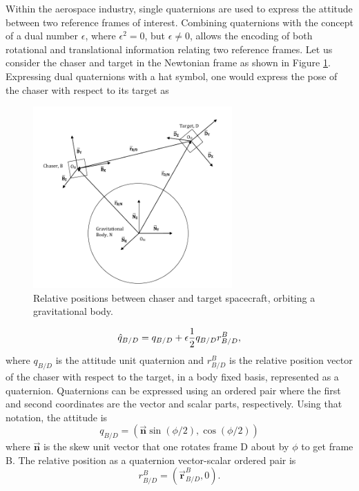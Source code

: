 \documentclass[letterpaper, preprint, paper,11pt]{AAS}	%
\begin{document}
Within the aerospace industry, single quaternions are used to express the attitude between two reference frames of interest. Combining quaternions with the concept of a dual number $\epsilon$, where $\epsilon^2 = 0$, but $\epsilon \ne 0$, allows the encoding of both rotational and translational information relating two reference frames. Let us consider the chaser and target in the Newtonian frame as shown in Figure \ref{fig:Rel_Pos}. Expressing dual quaternions with a hat symbol, one would express the pose of the chaser with respect to its target as

\begin{figure}[h!]
	\centering\includegraphics[width=3.0in]{Figures/REL_POSE.pdf}
	\caption{Relative positions between chaser and target spacecraft, orbiting a gravitational body.}
	\label{fig:Rel_Pos}
\end{figure}

\begin{equation}
\begin{aligned}
\label{eq:dual_quat_eg}
\hat{q}_{B/D} = q_{B/D} + \epsilon \frac{1}{2} q_{B/D} r^B_{B/D},
\end{aligned}\\
\end{equation}
where $q_{B/D}$ is the attitude unit quaternion and $r^B_{B/D}$ is the relative position vector of the chaser with respect to the target, in a body fixed basis, represented as a quaternion. Quaternions can be expressed using an ordered pair where the first and second coordinates are the vector and scalar parts, respectively. Using that notation, the attitude is
\begin{equation}
\label{eq:att_quat}
q_{B/D} = (\vec{\mathbf{n}}\sin{(\phi/2)} , \cos{(\phi/2)}) 
\end{equation}
where $\vec{\mathbf{n}}$ is the skew unit vector that one rotates frame D about by $\phi$ to get frame B. The relative position as a quaternion vector-scalar ordered pair is 
\begin{equation}
\label{eq:pos_quat}
r_{B/D}^B = (\vec{\mathbf{r}}_{B/D}^B, 0).
\end{equation}
\end{document}
